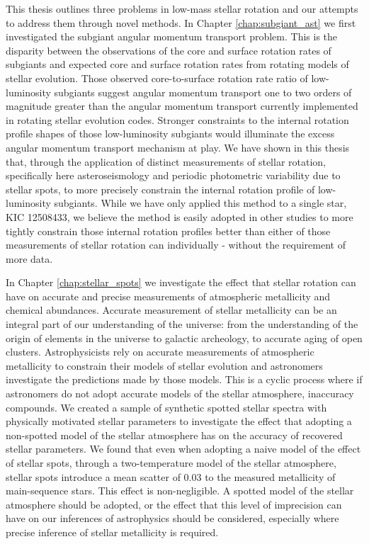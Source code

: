 This thesis outlines three problems in low-mass stellar rotation and our attempts to address them through novel methods.
In Chapter \ref{chap:subgiant_ast} we first investigated the subgiant angular momentum transport problem.
This is the disparity between the observations of the core and surface rotation rates of subgiants and expected core and surface rotation rates from rotating models of stellar evolution.
Those observed core-to-surface rotation rate ratio of low-luminosity subgiants suggest angular momentum transport one to two orders of magnitude greater than the angular momentum transport currently implemented in rotating stellar evolution codes.
Stronger constraints to the internal rotation profile shapes of those low-luminosity subgiants would illuminate the excess angular momentum transport mechanism at play.
We have shown in this thesis that, through the application of distinct measurements of stellar rotation, specifically here asteroseismology and periodic photometric variability due to stellar spots, to more precisely constrain the internal rotation profile of low-luminosity subgiants.
While we have only applied this method to a single star, KIC 12508433, we believe the method is easily adopted in other studies to more tightly constrain those internal rotation profiles better than either of those measurements of stellar rotation can individually - without the requirement of more data.

In Chapter \ref{chap:stellar_spots} we investigate the effect that stellar rotation can have on accurate and precise measurements of atmospheric metallicity and chemical abundances.
Accurate measurement of stellar metallicity can be an integral part of our understanding of the universe: from the understanding of the origin of elements in the universe to galactic archeology, to accurate aging of open clusters.
Astrophysicists rely on accurate measurements of atmospheric metallicity to constrain their models of stellar evolution and astronomers investigate the predictions made by those models.
This is a cyclic process where if astronomers do not adopt accurate models of the stellar atmosphere, inaccuracy compounds.
We created a sample of synthetic spotted stellar spectra with physically motivated stellar parameters to investigate the effect that adopting a non-spotted model of the stellar atmosphere has on the accuracy of recovered stellar parameters.
We found that even when adopting a naive model of the effect of stellar spots, through a two-temperature model of the stellar atmosphere, stellar spots introduce a mean scatter of 0.03 to the measured metallicity of main-sequence stars.
This effect is non-negligible. 
A spotted model of the stellar atmosphere should be adopted, or the effect that this level of imprecision can have on our inferences of astrophysics should be considered, especially where precise inference of stellar metallicity is required.

